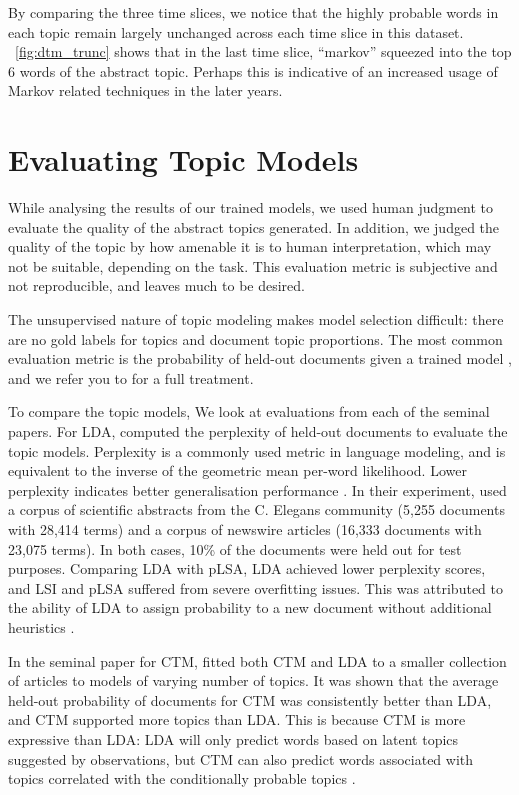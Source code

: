 \documentclass[letterpaper]{article}
\begin{document}
By comparing the three time slices, we notice that the highly probable
words in each topic remain largely unchanged across each time slice in
this dataset. ~\autoref{fig:dtm_trunc} shows that in the last time
slice, ``markov'' squeezed into the top 6 words of the abstract topic.
Perhaps this is indicative of an increased usage of Markov related
techniques in the later years.

\section{Evaluating Topic Models}
\label{sec:evaluation}
While analysing the results of our trained models, we used human
judgment to evaluate the quality of the abstract topics generated. In
addition, we judged the quality of the topic by how amenable it is to
human interpretation, which may not be suitable, depending on the
task. This evaluation metric is subjective and not reproducible, and
leaves much to be desired.

The unsupervised nature of topic modeling makes model selection
difficult: there are no gold labels for topics and document topic
proportions. The most common evaluation metric is the probability of
held-out documents given a trained model \cite{wallach2009evaluation},
and we refer you to \citeauthor{wallach2009evaluation} for a full
treatment.

To compare the topic models, We look at evaluations from each of the
seminal papers. For LDA, \citeauthor{blei2003latent} computed the
perplexity of held-out documents to evaluate the topic models.
Perplexity is a commonly used metric in language modeling, and is
equivalent to the inverse of the geometric mean per-word likelihood.
Lower perplexity indicates better generalisation performance
\cite{blei2003latent}. In their experiment,
\citeauthor{blei2003latent} used a corpus of scientific abstracts from
the C. Elegans community (5,255 documents with 28,414 terms) and a
corpus of newswire articles (16,333 documents with 23,075 terms). In
both cases, 10\% of the documents were held out for test purposes.
Comparing LDA with pLSA, LDA achieved lower perplexity scores, and LSI
and pLSA suffered from severe overfitting issues. This was attributed
to the ability of LDA to assign probability to a new document without
additional heuristics \cite{blei2003latent}.

In the seminal paper for CTM, \citeauthor{blei2005correlated} fitted
both CTM and LDA to a smaller collection of articles to models of
varying number of topics. It was shown that the average held-out
probability of documents for CTM was consistently better than LDA, and
CTM supported more topics than LDA. This is because CTM is more
expressive than LDA: LDA will only predict words based on latent
topics suggested by observations, but CTM can also predict words
associated with topics correlated with the conditionally probable
topics \cite{blei2005correlated}.
\end{document}
